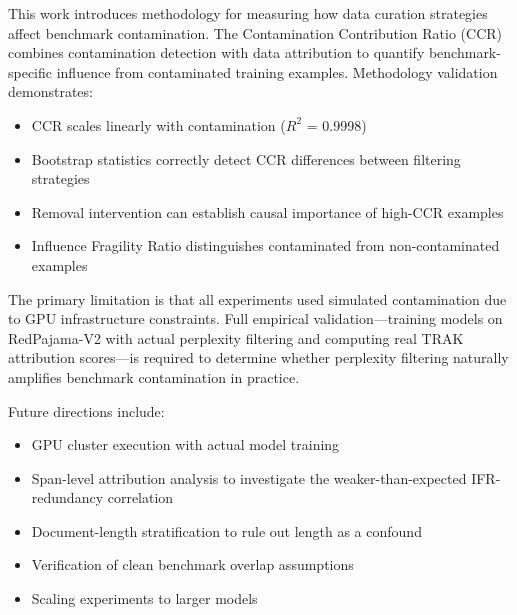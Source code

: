 
This work introduces methodology for measuring how data curation strategies affect benchmark contamination. The Contamination Contribution Ratio (CCR) combines contamination detection with data attribution to quantify benchmark-specific influence from contaminated training examples. Methodology validation demonstrates:

\begin{itemize}
\item CCR scales linearly with contamination ($R^2$ = 0.9998)
\item Bootstrap statistics correctly detect CCR differences between filtering strategies
\item Removal intervention can establish causal importance of high-CCR examples
\item Influence Fragility Ratio distinguishes contaminated from non-contaminated examples
\end{itemize}

The primary limitation is that all experiments used simulated contamination due to GPU infrastructure constraints. Full empirical validation---training models on RedPajama-V2 with actual perplexity filtering and computing real TRAK attribution scores---is required to determine whether perplexity filtering naturally amplifies benchmark contamination in practice.

Future directions include:
\begin{itemize}
\item GPU cluster execution with actual model training
\item Span-level attribution analysis to investigate the weaker-than-expected IFR-redundancy correlation
\item Document-length stratification to rule out length as a confound
\item Verification of clean benchmark overlap assumptions
\item Scaling experiments to larger models
\end{itemize}
